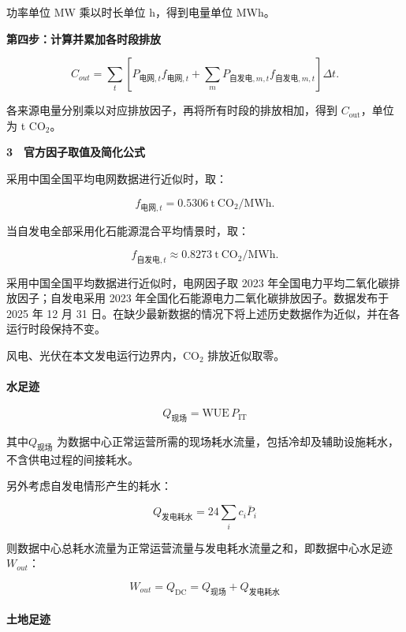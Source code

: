 功率单位 MW 乘以时长单位 h，得到电量单位 MWh。

\textbf{第四步：计算并累加各时段排放}

\begin{equation}
C_{out}{\mathrm{}}
=\sum_t\left[
P_{\text{电网},t}f_{\text{电网},t}
+\sum_mP_{\text{自发电},m,t}f_{\text{自发电},m,t}
\right]\Delta t.
\tag{4}
\end{equation}

各来源电量分别乘以对应排放因子，再将所有时段的排放相加，得到 $C_{\mathrm{out}}$，单位为 t CO$_2$。

\textbf{3　官方因子取值及简化公式}

采用中国全国平均电网数据进行近似时，取：

\begin{equation}
f_{\text{电网},t}=0.5306\ \mathrm{t\ CO_2/MWh}.
\tag{5}
\end{equation}

当自发电全部采用化石能源混合平均情景时，取：

\begin{equation}
f_{\text{自发电},t}\approx0.8273\ \mathrm{t\ CO_2/MWh}.
\tag{6}
\end{equation}

采用中国全国平均数据进行近似时，电网因子取 2023 年全国电力平均二氧化碳排放因子；自发电采用 2023 年全国化石能源电力二氧化碳排放因子。数据发布于 2025 年 12 月 31 日\cite{q2bref01,q2bref02}。在缺少最新数据的情况下将上述历史数据作为近似，并在各运行时段保持不变。

风电、光伏在本文发电运行边界内，CO$_2$ 排放近似取零。

\paragraph{水足迹}

\[
Q_{\text{现场}} =\mathrm{WUE}\,P_{\mathrm{IT}}
\]

其中$Q_{\text{现场}}$ 为数据中心正常运营所需的现场耗水流量，包括冷却及辅助设施耗水，不含供电过程的间接耗水。

另外考虑自发电情形产生的耗水：

\[
Q_{\text{发电耗水}}=24\sum_i c_i\bar P_i
\]

则数据中心总耗水流量为正常运营流量与发电耗水流量之和，即数据中心水足迹$W_{out}$：

\[
W_{out}=Q_{\mathrm{DC}}=Q_{\text{现场}}+Q_{\text{发电耗水}}
\]

\paragraph{土地足迹}

